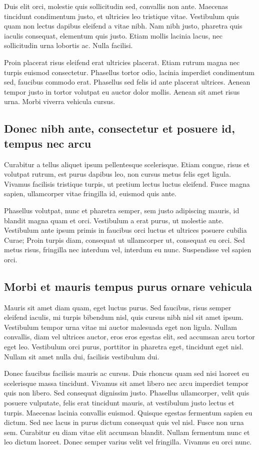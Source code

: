 Duis elit orci, molestie quis sollicitudin sed, convallis non ante.
Maecenas tincidunt condimentum justo, et ultricies leo tristique vitae.
Vestibulum quis quam non lectus dapibus eleifend a vitae nibh. Nam nibh
justo, pharetra quis iaculis consequat, elementum quis justo. Etiam mollis
lacinia lacus, nec sollicitudin urna lobortis ac. Nulla facilisi.

Proin placerat risus eleifend erat ultricies placerat. Etiam rutrum magna
nec turpis euismod consectetur. Phasellus tortor odio, lacinia imperdiet
condimentum sed, faucibus commodo erat. Phasellus sed felis id ante
placerat ultrices. Aenean tempor justo in tortor volutpat eu auctor dolor
mollis. Aenean sit amet risus urna. Morbi viverra vehicula cursus.

\subsection{Donec nibh ante, consectetur et posuere id, tempus nec arcu}
Curabitur a tellus aliquet ipsum pellentesque scelerisque. Etiam congue,
risus et volutpat rutrum, est purus dapibus leo, non cursus metus felis
eget ligula. Vivamus facilisis tristique turpis, ut pretium lectus luctus
eleifend. Fusce magna sapien, ullamcorper vitae fringilla id, euismod quis
ante.

Phasellus volutpat, nunc et pharetra semper, sem justo adipiscing mauris,
id blandit magna quam et orci. Vestibulum a erat purus, ut molestie ante.
Vestibulum ante ipsum primis in faucibus orci luctus et ultrices posuere
cubilia Curae; Proin turpis diam, consequat ut ullamcorper ut, consequat eu
orci. Sed metus risus, fringilla nec interdum vel, interdum eu nunc.
Suspendisse vel sapien orci.

\subsection{Morbi et mauris tempus purus ornare vehicula}
Mauris sit amet diam quam, eget luctus purus. Sed faucibus, risus semper
eleifend iaculis, mi turpis bibendum nisl, quis cursus nibh nisl sit amet
ipsum. Vestibulum tempor urna vitae mi auctor malesuada eget non ligula.
Nullam convallis, diam vel ultrices auctor, eros eros egestas elit, sed
accumsan arcu tortor eget leo. Vestibulum orci purus, porttitor in pharetra
eget, tincidunt eget nisl. Nullam sit amet nulla dui, facilisis vestibulum
dui.

Donec faucibus facilisis mauris ac cursus. Duis rhoncus quam sed nisi
laoreet eu scelerisque massa tincidunt. Vivamus sit amet libero nec arcu
imperdiet tempor quis non libero. Sed consequat dignissim justo. Phasellus
ullamcorper, velit quis posuere vulputate, felis erat tincidunt mauris, at
vestibulum justo lectus et turpis. Maecenas lacinia convallis euismod.
Quisque egestas fermentum sapien eu dictum. Sed nec lacus in purus dictum
consequat quis vel nisl. Fusce non urna sem. Curabitur eu diam vitae elit
accumsan blandit. Nullam fermentum nunc et leo dictum laoreet. Donec semper
varius velit vel fringilla. Vivamus eu orci nunc.

